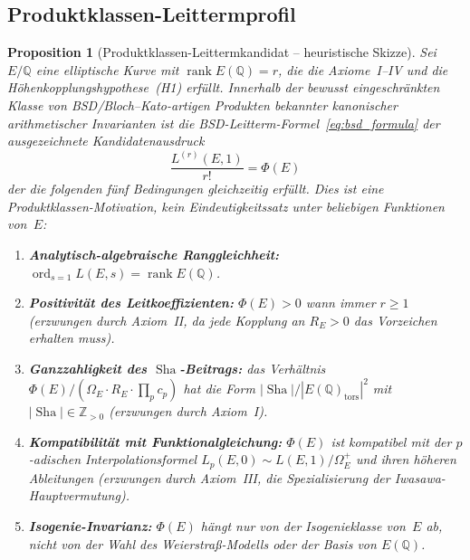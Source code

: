 \documentclass[aps,prd,twocolumn,superscriptaddress,nofootinbib,floatfix]{revtex4-2}
\newtheorem{proposition}[theorem]{Proposition}
\theoremstyle{definition}
\theoremstyle{remark}
\DeclareMathOperator{\ord}{ord}
\DeclareMathOperator{\rank}{rank}
\DeclareMathOperator{\Sha}{Sha}
\begin{document}
\subsection{Produktklassen-Leittermprofil}

\begin{proposition}[Produktklassen-Leittermkandidat -- heuristische Skizze]
\label{thm:uniqueness}
Sei $E/\mathbb{Q}$ eine elliptische Kurve mit $\rank E(\mathbb{Q}) = r$, die die Axiome~I--IV und die Höhenkopplungshypothese~(H1) erfüllt. Innerhalb der bewusst eingeschränkten Klasse von BSD/Bloch--Kato-artigen Produkten bekannter kanonischer arithmetischer Invarianten ist die BSD-Leitterm-Formel~\eqref{eq:bsd_formula} der ausgezeichnete Kandidatenausdruck
\[
  \frac{L^{(r)}(E,1)}{r!} = \Phi(E)
\]
der die folgenden fünf Bedingungen gleichzeitig erfüllt. Dies ist eine Produktklassen-Motivation, kein Eindeutigkeitssatz unter beliebigen Funktionen von~$E$:
\begin{enumerate}
  \item[\textbf{(U1)}] \textbf{Analytisch-algebraische Ranggleichheit:} $\ord_{s=1} L(E,s) = \rank E(\mathbb{Q})$.
  \item[\textbf{(U2)}] \textbf{Positivität des Leitkoeffizienten:} $\Phi(E) > 0$ wann immer $r \geq 1$ (erzwungen durch Axiom~II, da jede Kopplung an $R_E > 0$ das Vorzeichen erhalten muss).
  \item[\textbf{(U3)}] \textbf{Ganzzahligkeit des $\Sha$-Beitrags:} das Verhältnis $\Phi(E)/(\Omega_E \cdot R_E \cdot \prod_p c_p)$ hat die Form $|\Sha|/|E(\mathbb{Q})_{\mathrm{tors}}|^2$ mit $|\Sha| \in \mathbb{Z}_{>0}$ (erzwungen durch Axiom~I).
  \item[\textbf{(U4)}] \textbf{Kompatibilität mit Funktionalgleichung:} $\Phi(E)$ ist kompatibel mit der $p$-adischen Interpolationsformel $L_p(E,0) \sim L(E,1)/\Omega_E^+$ und ihren höheren Ableitungen (erzwungen durch Axiom~III, die Spezialisierung der Iwasawa-Hauptvermutung).
  \item[\textbf{(U5)}] \textbf{Isogenie-Invarianz:} $\Phi(E)$ hängt nur von der Isogenieklasse von~$E$ ab, nicht von der Wahl des Weierstraß-Modells oder der Basis von $E(\mathbb{Q})$.
\end{enumerate}
\end{proposition}
\end{document}
